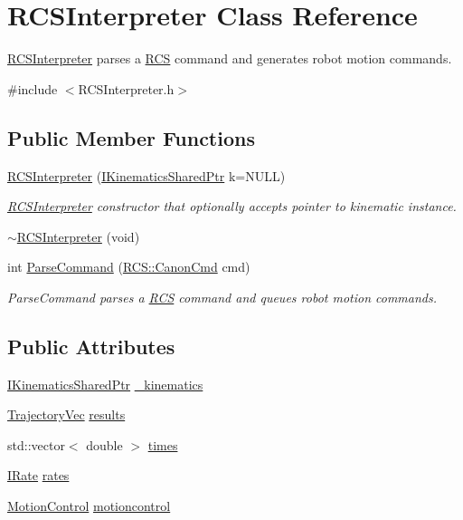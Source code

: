 \hypertarget{classRCSInterpreter}{\section{R\-C\-S\-Interpreter Class Reference}
\label{classRCSInterpreter}
}


\hyperlink{classRCSInterpreter}{R\-C\-S\-Interpreter} parses a \hyperlink{namespaceRCS}{R\-C\-S} command and generates robot motion commands.  




{\ttfamily \#include $<$R\-C\-S\-Interpreter.\-h$>$}

\subsection*{Public Member Functions}
\begin{DoxyCompactItemize}
\item 
\hyperlink{classRCSInterpreter_abf39be78f8107db4844c33434fe33caf}{R\-C\-S\-Interpreter} (\hyperlink{Kinematics_8h_aa720b9842c846588baf215581fb9f902}{I\-Kinematics\-Shared\-Ptr} k=N\-U\-L\-L)
\begin{DoxyCompactList}\small\item\em \hyperlink{classRCSInterpreter}{R\-C\-S\-Interpreter} constructor that optionally accepts pointer to kinematic instance. \end{DoxyCompactList}\item 
\hyperlink{classRCSInterpreter_a540468718197e24d7c20cc1f43696715}{$\sim$\-R\-C\-S\-Interpreter} (void)
\item 
int \hyperlink{classRCSInterpreter_a7f7cee6a3606a2b3f22ca3f802a1fc39}{Parse\-Command} (\hyperlink{structRCS_1_1CanonCmd}{R\-C\-S\-::\-Canon\-Cmd} cmd)
\begin{DoxyCompactList}\small\item\em Parse\-Command parses a \hyperlink{namespaceRCS}{R\-C\-S} command and queues robot motion commands. \end{DoxyCompactList}\end{DoxyCompactItemize}
\subsection*{Public Attributes}
\begin{DoxyCompactItemize}
\item 
\hyperlink{Kinematics_8h_aa720b9842c846588baf215581fb9f902}{I\-Kinematics\-Shared\-Ptr} \hyperlink{classRCSInterpreter_a0a78e67ba785253bf3de6877294da699}{\-\_\-kinematics}
\item 
\hyperlink{demo_8cpp_a2a09344c15175b0b6ea4da8bbffa8106}{Trajectory\-Vec} \hyperlink{classRCSInterpreter_a7b71ecaad68a14cc341d98d463e6f5b5}{results}
\item 
std\-::vector$<$ double $>$ \hyperlink{classRCSInterpreter_a2437a1768cfa972b39ff56c8f16ff3c1}{times}
\item 
\hyperlink{classIRate}{I\-Rate} \hyperlink{classRCSInterpreter_a11b1a673682a9d0451877d3b5c3e0e3e}{rates}
\item 
\hyperlink{classMotionControl}{Motion\-Control} \hyperlink{classRCSInterpreter_ae59648ec8d61ea6957bbd320f2a4665a}{motioncontrol}
\end{DoxyCompactItemize}
